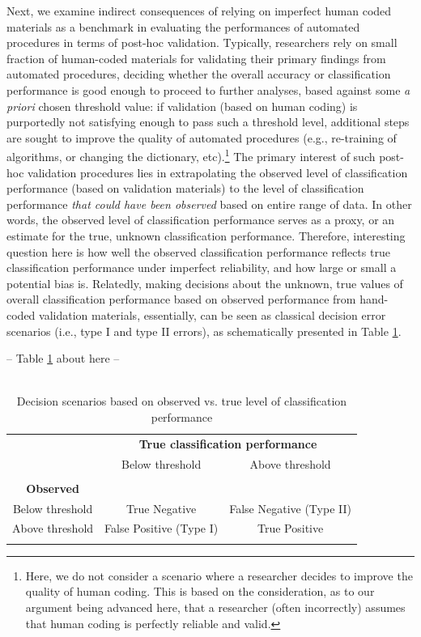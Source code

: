\documentclass[man, 12pt, a4paper, nolmodern, noextraspace]{apa6}
\begin{document}
Next, we examine indirect consequences of relying on imperfect human coded materials as a benchmark in evaluating the performances of automated procedures in terms of post-hoc validation. Typically, researchers rely on  small fraction of human-coded materials for validating their primary findings from automated procedures, deciding whether the overall accuracy or classification performance is good enough to proceed to further analyses, based against some \textit{a priori} chosen threshold value: if validation (based on human coding) is purportedly not satisfying enough to pass such a threshold level, additional steps are sought to improve the quality of automated procedures (e.g., re-training of algorithms, or changing the dictionary, etc).\footnote{Here, we do not consider a scenario where a researcher decides to improve the quality of human coding. This is based on the consideration, as to our argument being advanced here, that a researcher (often incorrectly) assumes that human coding is perfectly reliable and valid.} The primary interest of such post-hoc validation procedures lies in extrapolating the observed level of classification performance (based on validation materials) to the level of classification performance \textit{that could have been observed} based on entire range of data. In other words, the observed level of classification performance serves as a proxy, or an estimate for the true, unknown classification performance. Therefore, interesting question here is how well the observed classification performance reflects true classification performance under imperfect reliability, and how large or small a potential bias is. Relatedly, making decisions about the unknown, true values of overall classification performance based on observed performance from hand-coded validation materials, essentially, can be seen as classical decision error scenarios (i.e., type I and type II errors), as schematically presented in Table \ref{tab:Table1}.
\centerline{ -- Table \ref{tab:Table1} about here -- }    

\begin{table}[!htbp] \centering 
	\begin{minipage}{\textwidth}
    \centering
  \caption{\\ Decision scenarios based on observed vs. true level of classification performance} 
  \label{tab:Table1} 
    \centering
  \begin{tabular}{ ccc}
\toprule
      \multicolumn{1}{c}{} &
      \multicolumn{2}{c}{\textbf{True classification performance}} \\
\cline{2-3}
 & Below threshold & Above threshold \\
\hline \\[-1.8ex] 
  \textbf{Observed} & & \\  
 Below threshold & True Negative & False Negative (Type II) \\ 
 Above threshold & False Positive (Type I) & True Positive \\ 
\hline \\[-1.8ex]  
	\end{tabular}
 	\end{minipage}
\end{table} 
\end{document}
